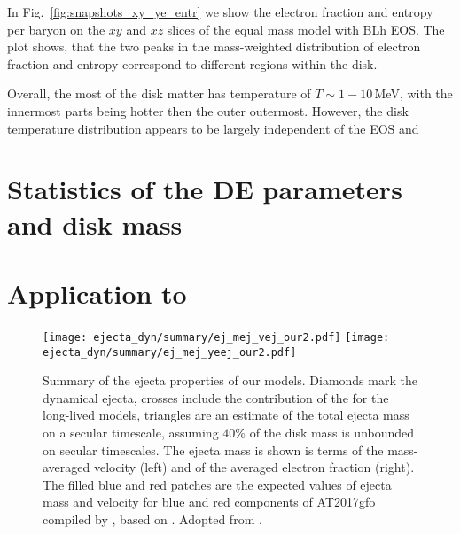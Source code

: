 In Fig.~\ref{fig:snapshots_xy_ye_entr} we show the electron fraction 
and entropy per baryon on the $xy$ and $xz$ slices of the equal 
mass model with BLh \ac{EOS}.
The plot shows, that the two peaks in the mass-weighted distribution 
of electron fraction and entropy correspond to different regions within the disk.

Overall, the most of the disk matter has temperature of $T\sim 1-10\,$MeV, with the innermost parts being hotter then the outer outermost. 
However, the disk temperature distribution appears to be largely independent of the \ac{EOS} and \mr{}







\section{Statistics of the \ac{DE} parameters and disk mass}



\section{Application to \GW{}}


\begin{figure*}[t]
    \centering 
    \texttt{[image: ejecta\_dyn/summary/ej\_mej\_vej\_our2.pdf]}
    \texttt{[image: ejecta\_dyn/summary/ej\_mej\_yeej\_our2.pdf]}
    \caption{
        Summary of the ejecta properties of our models.
        Diamonds mark the dynamical ejecta, crosses include the
        contribution of the \swind{} for the long-lived models, 
        triangles are an estimate of the total ejecta mass on a secular
        timescale, assuming $40\%$ of the disk mass is unbounded on
        secular timescales.         
        The ejecta mass is shown is terms of the mass-averaged velocity
        (left) and of the averaged electron fraction (right).
        The filled blue and red patches are the expected values of
        ejecta mass and velocity for blue and red components of
        AT2017gfo compiled by \cite{Siegel:2019mlp}, based on
        \cite{Villar:2017wcc}. 
        Adopted from \citet{Nedora:2020pak}.
    }
    \label{fig:ejecta:dyn:ds_sww}
\end{figure*}


